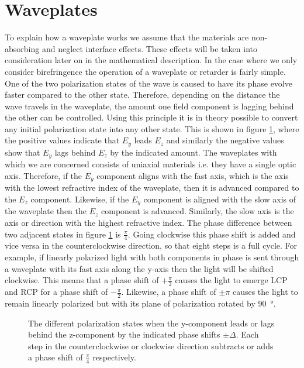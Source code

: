 \section{Waveplates}
\label{sec:waveplates}
To explain how a waveplate works we assume that the materials are non-absorbing and neglect interface effects. These effects will be taken into consideration later on in the mathematical description. In the case where we only consider birefringence the operation of a waveplate or retarder is fairly simple. One of the two polarization states of the wave is caused to have its phase evolve faster compared to the other state. Therefore, depending on the distance the wave travels in the waveplate, the amount one field component is lagging behind the other can be controlled. Using this principle it is in theory possible to convert any initial polarization state into any other state. This is shown in figure \ref{fig:waveplate_conversions}, where the positive values indicate that $E_y$ leads $E_z$ and similarly the negative values show that $E_y$ lags behind $E_z$ by the indicated amount. The waveplates with which we are concerned consists of uniaxial materials i.e. they have a single optic axis. Therefore, if the $E_y$ component aligns with the fast axis, which is the axis with the lowest refractive index of the waveplate, then it is advanced compared to the $E_z$ component. Likewise, if the $E_y$ component is aligned with the slow axis of the waveplate then the $E_z$ component is advanced. Similarly, the slow axis is the axis or direction with the highest refractive index. The phase difference between two adjacent states in figure \ref{fig:waveplate_conversions} is $\frac{\pi}{4}$. Going clockwise this phase shift is added and vice versa in the counterclockwise direction, so that eight steps is a full cycle. For example, if linearly polarized light with both components in phase is sent through a waveplate with its fast axis along the y-axis then the light will be shifted clockwise. This means that a phase shift of $+\frac{\pi}{2}$ causes the light to emerge LCP and RCP for a phase shift of $-\frac{\pi}{2}$. Likewise, a phase shift of $\pm \pi$ causes the light to remain linearly polarized but with its plane of polarization rotated by \SI{90}{\degree}.

\newpage

\begin{figure}[h]
    \centering
    
    \caption{The different polarization states when the y-component leads or lags behind the z-component by the indicated phase shifts $\pm \Delta$. Each step in the counterclockwise or clockwise direction subtracts or adds a phase shift of $\frac{\pi}{4}$ respectively.}
    \label{fig:waveplate_conversions}
\end{figure}

